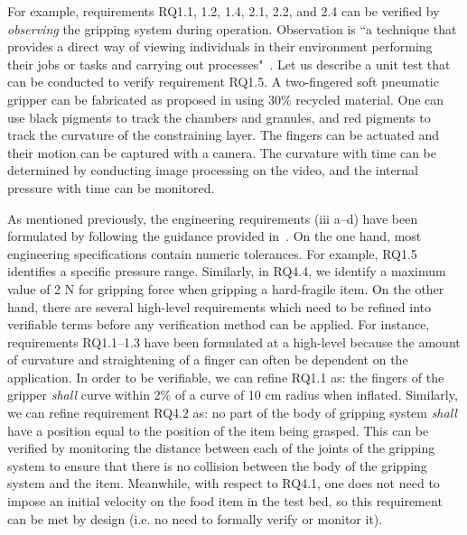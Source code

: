 \documentclass[letterpaper, 10 pt, conference]{ieeeconf}  %
\begin{document}
	For example, requirements RQ1.1, 1.2, 1.4, 2.1, 2.2, and 2.4 can be verified by \emph{observing} the gripping system during operation. 
	Observation is ``a technique that provides a direct way of viewing individuals in their environment performing their jobs or tasks and carrying out processes"~\cite{ISO24765:2017}.
	Let us describe a unit test that can be conducted to verify requirement RQ1.5. 
	A two-fingered soft pneumatic gripper can be fabricated as proposed in \cite{Partridge2022} using 30\% recycled material. 
	One can use black pigments to track the chambers and granules, and red pigments to track the curvature of the constraining layer. 
	The fingers can be actuated and their motion can be captured with a camera. 
	The curvature with time can be determined by conducting image processing on the video, and the internal pressure with time can be monitored.
	
	As mentioned previously, the engineering requirements (iii a--d) have been formulated by following the guidance provided in~\cite{NASA2007}. 
	On the one hand, most engineering specifications contain numeric tolerances. 
	For example, RQ1.5 identifies a specific pressure range. 
	Similarly, in RQ4.4, we identify a maximum value of 2 N for gripping force when gripping a hard-fragile item. 
	On the other hand, there are several high-level requirements which need to be refined into verifiable terms before any verification method can be applied.  
	For instance, requirements RQ1.1--1.3 have been formulated at a high-level because the amount of curvature and straightening of a finger can often be dependent on the application. 
	In order to be verifiable, we can refine RQ1.1 as: the fingers of the gripper \emph{shall} curve within 2\% of a curve of 10 cm radius when inflated. 
	Similarly, we can refine requirement RQ4.2 as: no part of the body of gripping system \emph{shall} have a position equal to the position of the item being grasped. 
	This can be verified by monitoring the distance between each of the joints of the gripping system to ensure that there is no collision between the body of the gripping system and the item. 
	Meanwhile, with respect to RQ4.1, one does not need to impose an initial velocity on the food item in the test bed, so this requirement can be met by design (i.e. no need to formally verify or monitor it).
\end{document}
